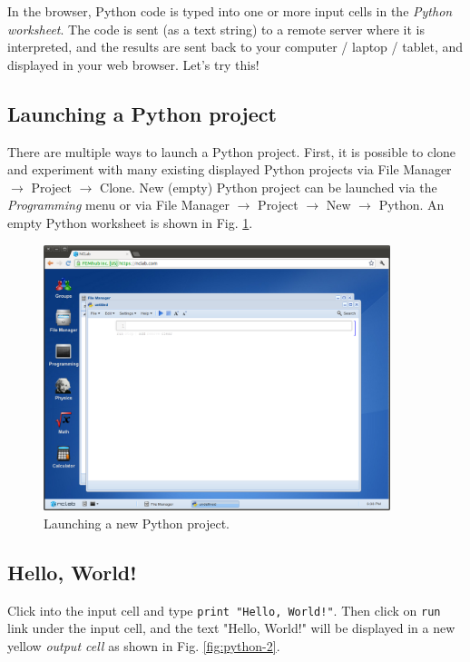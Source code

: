 In the browser, Python code is typed into one or more input cells in the {\em Python worksheet}. 
The code is sent (as a text string) to a remote server where it is interpreted, and the 
results are sent back to your computer / laptop / tablet, and displayed in your web 
browser.  Let's try this!

\subsection{Launching a Python project}

There are multiple ways to launch a Python project. First, it is 
possible to clone and experiment with many existing displayed Python 
projects via File Manager $\rightarrow$ 
Project $\rightarrow$ Clone. New (empty) Python project can be launched via 
the {\em Programming} menu or via File Manager $\rightarrow$ 
Project $\rightarrow$ New $\rightarrow$ Python. An empty Python worksheet
is shown in Fig. \ref{fig:python}.

\newpage
\begin{figure}[!ht]
\begin{center}
\includegraphics[width=0.9\textwidth]{imgp/python.png}
\end{center}
\vspace{-2mm}
\caption{Launching a new Python project.}
\label{fig:python}
\end{figure}


\subsection{Hello, World!}

Click into the input cell and type {\tt print "Hello, World!"}.
Then click on {\tt run} link under the input cell, and the text 
"Hello, World!" will be displayed 
in a new yellow {\em output cell} as shown in Fig. \ref{fig:python-2}.

